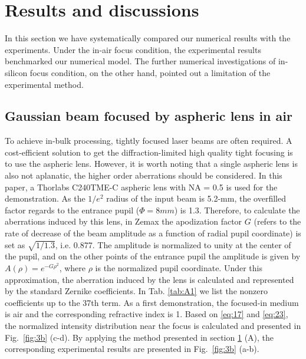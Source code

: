 \documentclass[9pt,twocolumn,twoside]{osajnl}
\begin{document}
\section{Results and discussions} \label{section:3}
In this section we have systematically compared our numerical results with the experiments. Under the in-air focus condition, the experimental results benchmarked our numerical model. The further numerical investigations of in-silicon focus condition, on the other hand, pointed out a limitation of the experimental method.

\subsection{Gaussian beam focused by aspheric lens in air}
To achieve in-bulk processing, tightly focused laser beams are often required. A cost-efficient solution to get the diffraction-limited high quality tight focusing is to use the aspheric lens. However, it is worth noting that a single aspheric lens is also not aplanatic, the higher order aberrations should be considered.
In this paper, a Thorlabs C240TME-C aspheric lens with NA = 0.5 is used for the demonstration. As the $1/e^2$ radius of the input beam is 5.2-mm, the overfilled factor regards to the entrance pupil ($\Phi = 8 mm$) is 1.3. Therefore, to calculate the aberrations induced by this lens, in Zemax the apodization factor $G$ (refers to the rate of decrease of the beam amplitude as a function of radial pupil coordinate) is set as $\sqrt{1/1.3}$, i.e. 0.877. The amplitude is normalized to unity at the center of the pupil, and on the other points of the entrance pupil the amplitude is given by $A(\rho)=e^{-G\rho^2}$, where $\rho$ is the normalized pupil coordinate. Under this approximation, the aberration induced by the lens is calculated and represented by the standard Zernike coefficients. In Tab. \ref{tab:A1}  we list the nonzero coefficients up to the 37th term. As a first demonstration, the focused-in medium is air and the corresponding refractive index is 1. Based on \eqref{eq:17} and \eqref{eq:23}, the normalized intensity distribution near the focus is calculated and presented in Fig.~\ref{fig:3b} (c-d). By applying the method presented in section \ref{section:3} (A), the corresponding experimental results are presented in Fig.~\ref{fig:3b} (a-b).  
\end{document}
